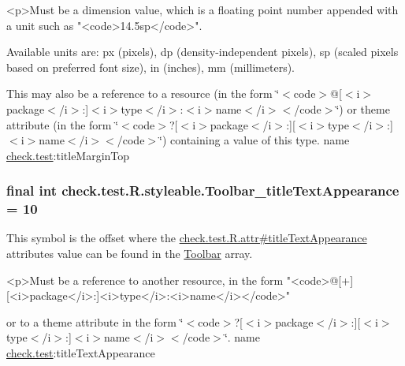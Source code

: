 \begin{DoxyVerb}      <p>Must be a dimension value, which is a floating point number appended with a unit such as "<code>14.5sp</code>".
\end{DoxyVerb}
 Available units are\+: px (pixels), dp (density-\/independent pixels), sp (scaled pixels based on preferred font size), in (inches), mm (millimeters). 

This may also be a reference to a resource (in the form \char`\"{}$<$code$>$@\mbox{[}$<$i$>$package$<$/i$>$\+:\mbox{]}$<$i$>$type$<$/i$>$\+:$<$i$>$name$<$/i$>$$<$/code$>$\char`\"{}) or theme attribute (in the form \char`\"{}$<$code$>$?\mbox{[}$<$i$>$package$<$/i$>$\+:\mbox{]}\mbox{[}$<$i$>$type$<$/i$>$\+:\mbox{]}$<$i$>$name$<$/i$>$$<$/code$>$\char`\"{}) containing a value of this type.  name \hyperlink{namespacecheck_1_1test}{check.\+test}\+:title\+Margin\+Top \hypertarget{classcheck_1_1test_1_1_r_1_1styleable_a57757c8f75dedaa99dff594776088620}{}
\subsubsection[{Toolbar\+\_\+title\+Text\+Appearance}]{\setlength{\rightskip}{0pt plus 5cm}final int check.\+test.\+R.\+styleable.\+Toolbar\+\_\+title\+Text\+Appearance = 10\hspace{0.3cm}{\ttfamily [static]}}\label{classcheck_1_1test_1_1_r_1_1styleable_a57757c8f75dedaa99dff594776088620}
This symbol is the offset where the \hyperlink{classcheck_1_1test_1_1_r_1_1attr_a2c9b484e1413a3ab292ec0c0e06b6243}{check.\+test.\+R.\+attr\#title\+Text\+Appearance} attribute\textquotesingle{}s value can be found in the \hyperlink{classcheck_1_1test_1_1_r_1_1styleable_a1a7fa90223693abef77e7484cca2df54}{Toolbar} array.

\begin{DoxyVerb}      <p>Must be a reference to another resource, in the form "<code>@[+][<i>package</i>:]<i>type</i>:<i>name</i></code>"
\end{DoxyVerb}
 or to a theme attribute in the form \char`\"{}$<$code$>$?\mbox{[}$<$i$>$package$<$/i$>$\+:\mbox{]}\mbox{[}$<$i$>$type$<$/i$>$\+:\mbox{]}$<$i$>$name$<$/i$>$$<$/code$>$\char`\"{}.  name \hyperlink{namespacecheck_1_1test}{check.\+test}\+:title\+Text\+Appearance \hypertarget{classcheck_1_1test_1_1_r_1_1styleable_ad2cf34c85cd9f2275558a3082471052a}{}
